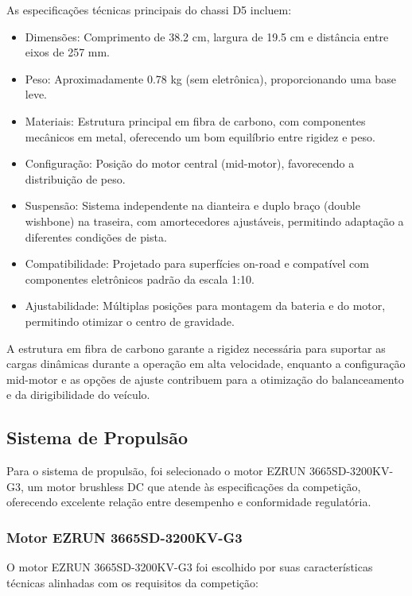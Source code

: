 As especificações técnicas principais do chassi D5 incluem:
\begin{itemize}
      \item Dimensões: Comprimento de 38.2 cm, largura de 19.5 cm e distância entre eixos
            de 257 mm.
      \item Peso: Aproximadamente 0.78 kg (sem eletrônica), proporcionando uma base leve.
      \item Materiais: Estrutura principal em fibra de carbono, com componentes mecânicos
            em metal, oferecendo um bom equilíbrio entre rigidez e peso.
      \item Configuração: Posição do motor central (mid-motor), favorecendo a distribuição
            de peso.
      \item Suspensão: Sistema independente na dianteira e duplo braço (double wishbone) na
            traseira, com amortecedores ajustáveis, permitindo adaptação a diferentes
            condições de pista.
      \item Compatibilidade: Projetado para superfícies on-road e compatível com
            componentes eletrônicos padrão da escala 1:10.
      \item Ajustabilidade: Múltiplas posições para montagem da bateria e do motor,
            permitindo otimizar o centro de gravidade.
\end{itemize}

A estrutura em fibra de carbono garante a rigidez necessária para suportar as
cargas dinâmicas durante a operação em alta velocidade, enquanto a configuração
mid-motor e as opções de ajuste contribuem para a otimização do balanceamento e
da dirigibilidade do veículo.

\subsection{Sistema de Propulsão}

Para o sistema de propulsão, foi selecionado o motor EZRUN 3665SD-3200KV-G3, um
motor brushless DC que atende às especificações da competição, oferecendo
excelente relação entre desempenho e conformidade regulatória.

\subsubsection{Motor EZRUN 3665SD-3200KV-G3}

O motor EZRUN 3665SD-3200KV-G3 foi escolhido por suas características técnicas
alinhadas com os requisitos da competição:

